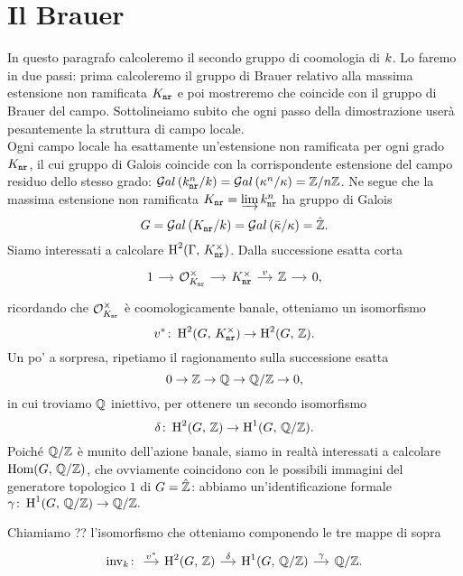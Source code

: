 \section{Il Brauer}
In questo paragrafo calcoleremo il secondo gruppo di coomologia di $ k $. Lo faremo in due passi: prima calcoleremo il gruppo di Brauer relativo alla massima estensione non ramificata $ K_\mathtt{nr} $ e poi mostreremo che coincide con il gruppo di Brauer del campo. Sottolineiamo subito che ogni passo della dimostrazione userà pesantemente la struttura di campo locale.  \\

Ogni campo locale ha esattamente un'estensione non ramificata per ogni grado $ K_\mathtt{nr} $, il cui gruppo di Galois coincide con la corrispondente estensione del campo residuo dello stesso grado: $ \mathcal{G}al\left( k^n_\texttt{nr} / k \right) = \mathcal{G}al\left( \kappa^n / \kappa \right) = \mathbb{Z} / n\mathbb{Z} $. Ne segue che la massima estensione non ramificata $ K_\mathtt{nr} = \varinjlim k^n_\texttt{nr} $ ha gruppo di Galois
\[ G = \mathcal{G}al\left( K_\mathtt{nr} / k \right) = \mathcal{G}al\left( \bar{\kappa} / \kappa \right) = \hat{\mathbb{Z}}. \]
Siamo interessati a calcolare $ \operatorname{H}^2(\Gamma, \, K_\mathtt{nr}^\times) $. Dalla successione esatta corta
\[ \begin{tikzcd}[column sep = small]
1 \rar
& \mathcal{O}_{\knr}^\times \rar
& \knr^\times \rar["v"]
& \Z \rar
& 0,
\end{tikzcd} \]
ricordando che $ \mathcal{O}_{K_\mathtt{nr}}^\times $ è coomologicamente banale, otteniamo un isomorfismo
\[ v^* \colon \operatorname{H}^2(G, \, K_\mathtt{nr}^\times) \to \operatorname{H}^2(G, \, \mathbb{Z}). \]
Un po' a sorpresa, ripetiamo il ragionamento sulla successione esatta
\[ 0 \to \mathbb{Z} \to \mathbb{Q} \to \mathbb{Q}/\mathbb{Z} \to 0, \]
in cui troviamo $ \mathbb{Q} $ iniettivo, per ottenere un secondo isomorfismo
\[ \delta \colon \operatorname{H}^2(G, \, \mathbb{Z}) \to \operatorname{H}^1(G, \, \mathbb{Q}/\mathbb{Z}). \]
Poiché $ \mathbb{Q}/\mathbb{Z} $ è munito dell'azione banale, siamo in realtà interessati a calcolare $ \operatorname{Hom}(G, \, \mathbb{Q}/\mathbb{Z}) $, che ovviamente coincidono con le possibili immagini del generatore topologico $ 1 $ di $ G = \hat{\mathbb{Z}} $: abbiamo un'identificazione formale $ \gamma \colon \operatorname{H}^1(G, \, \mathbb{Q}/\mathbb{Z}) \to \mathbb{Q}/\mathbb{Z}.  $

\begin{definition}
	Chiamiamo ?? l'isomorfismo che otteniamo componendo le tre mappe di sopra
	\[ \begin{tikzcd}[column sep = small]
	\inv_\K \colon  \rar["v^*"]
	& \HH^2(G, \, \Z) \rar["\delta"]
	& \HH^1(G, \, \Q/\Z) \rar["\gamma"]
	& \Q/\Z.
	\end{tikzcd} \]
\end{definition}


